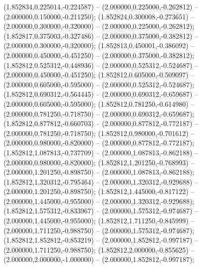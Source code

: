  (1.852834,0.225014,-0.224587) -- (2.000000,0.225000,-0.262812) -- (2.000000,0.150000,-0.211250);
 (1.852824,0.300008,-0.273651) -- (2.000000,0.300000,-0.320000) -- (2.000000,0.225000,-0.262812);
 (1.852817,0.375003,-0.327486) -- (2.000000,0.375000,-0.382812) -- (2.000000,0.300000,-0.320000);
 (1.852813,0.450001,-0.386092) -- (2.000000,0.450000,-0.451250) -- (2.000000,0.375000,-0.382812);
 (1.852812,0.525312,-0.448936) -- (2.000000,0.525312,-0.524687) -- (2.000000,0.450000,-0.451250);
 (1.852812,0.605000,-0.509097) -- (2.000000,0.605000,-0.595000) -- (2.000000,0.525312,-0.524687);
 (1.852812,0.690312,-0.564445) -- (2.000000,0.690312,-0.659687) -- (2.000000,0.605000,-0.595000);
 (1.852812,0.781250,-0.614980) -- (2.000000,0.781250,-0.718750) -- (2.000000,0.690312,-0.659687);
 (1.852812,0.877812,-0.660703) -- (2.000000,0.877812,-0.772187) -- (2.000000,0.781250,-0.718750);
 (1.852812,0.980000,-0.701612) -- (2.000000,0.980000,-0.820000) -- (2.000000,0.877812,-0.772187);
 (1.852812,1.087813,-0.737709) -- (2.000000,1.087813,-0.862188) -- (2.000000,0.980000,-0.820000);
 (1.852812,1.201250,-0.768993) -- (2.000000,1.201250,-0.898750) -- (2.000000,1.087813,-0.862188);
 (1.852812,1.320312,-0.795464) -- (2.000000,1.320312,-0.929688) -- (2.000000,1.201250,-0.898750);
 (1.852812,1.445000,-0.817122) -- (2.000000,1.445000,-0.955000) -- (2.000000,1.320312,-0.929688);
 (1.852812,1.575312,-0.833967) -- (2.000000,1.575312,-0.974687) -- (2.000000,1.445000,-0.955000);
 (1.852812,1.711250,-0.845999) -- (2.000000,1.711250,-0.988750) -- (2.000000,1.575312,-0.974687);
 (1.852812,1.852812,-0.853219) -- (2.000000,1.852812,-0.997187) -- (2.000000,1.711250,-0.988750);
 (1.852812,2.000000,-0.855625) -- (2.000000,2.000000,-1.000000) -- (2.000000,1.852812,-0.997187);
